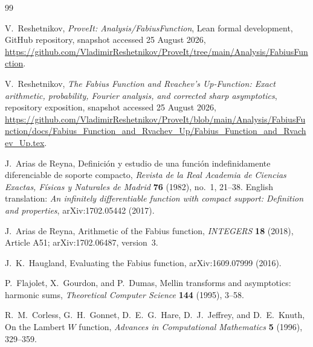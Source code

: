 \documentclass[11pt,oneside]{article}
\theoremstyle{definition}
\theoremstyle{remark}
\begin{document}
\begin{thebibliography}{99}

V.~Reshetnikov,
\newblock \emph{ProveIt: Analysis/FabiusFunction}, Lean formal development,
\newblock GitHub repository, snapshot accessed 25 August 2026,
\newblock \url{https://github.com/VladimirReshetnikov/ProveIt/tree/main/Analysis/FabiusFunction}.

V.~Reshetnikov,
\newblock \emph{The Fabius Function and Rvachev's Up-Function: Exact arithmetic, probability, Fourier analysis, and corrected sharp asymptotics},
\newblock repository exposition, snapshot accessed 25 August 2026,
\newblock \url{https://github.com/VladimirReshetnikov/ProveIt/blob/main/Analysis/FabiusFunction/docs/Fabius_Function_and_Rvachev_Up/Fabius_Function_and_Rvachev_Up.tex}.

J.~Arias de Reyna,
\newblock Definici\'on y estudio de una funci\'on indefinidamente diferenciable de soporte compacto,
\newblock \emph{Revista de la Real Academia de Ciencias Exactas, F\'isicas y Naturales de Madrid}
\textbf{76} (1982), no.~1, 21--38.
\newblock English translation: \emph{An infinitely differentiable function with compact support: Definition and properties}, arXiv:1702.05442 (2017).

J.~Arias de Reyna,
\newblock Arithmetic of the Fabius function,
\newblock \emph{INTEGERS} \textbf{18} (2018), Article A51; arXiv:1702.06487, version~3.

J.~K.~Haugland,
\newblock Evaluating the Fabius function,
\newblock arXiv:1609.07999 (2016).

P.~Flajolet, X.~Gourdon, and P.~Dumas,
\newblock Mellin transforms and asymptotics: harmonic sums,
\newblock \emph{Theoretical Computer Science} \textbf{144} (1995), 3--58.

R.~M.~Corless, G.~H.~Gonnet, D.~E.~G.~Hare, D.~J.~Jeffrey, and D.~E.~Knuth,
\newblock On the Lambert $W$ function,
\newblock \emph{Advances in Computational Mathematics} \textbf{5} (1996), 329--359.

\end{thebibliography}
\end{document}
